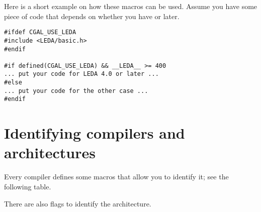 Here is a short example on how these macros can be used. Assume you have some
piece of code that depends on whether you have  or later.
\begin{verbatim}
#ifdef CGAL_USE_LEDA
#include <LEDA/basic.h>
#endif

#if defined(CGAL_USE_LEDA) && __LEDA__ >= 400
... put your code for LEDA 4.0 or later ...
#else
... put your code for the other case ...
#endif 
\end{verbatim}

\section{Identifying compilers and architectures\label{sec:which_compiler}}

Every compiler defines some macros that allow you to identify it; see 
the following table.

\vspace{5mm}\vspace{5mm}

\noindent There are also flags to identify the architecture.

\vspace{5mm}\vspace{5mm}

